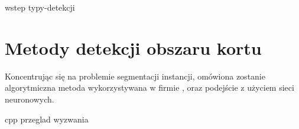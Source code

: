 {wstep}
{typy-detekcji}

\section{Metody detekcji obszaru kortu}
\label{sec:metody_detekcji}

Koncentrując się na problemie segmentacji instancji, omówiona zostanie algorytmiczna metoda wykorzystywana w firmie \blue{}, oraz podejście z użyciem sieci neuronowych. \\


{cpp}
{przeglad}
{wyzwania}
